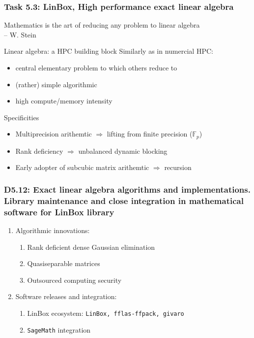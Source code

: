 \documentclass{beamer}
\begin{document}
\begin{frame}
  \frametitle{Task 5.3: LinBox, High performance exact linear algebra}
  \begin{displayquote}
    Mathematics is the art of reducing any problem to linear algebra\\
    \hfill{-- W. Stein}
      \end{displayquote}
  \begin{block} {Linear algebra: a HPC building block}
    Similarly as in numercial HPC:
    \begin{itemize}
    \item central elementary problem to which others reduce to
    \item (rather) simple algorithmic
    \item high compute/memory intensity
    \end{itemize}
  \end{block}
    \begin{block}{Specificities}
      \begin{itemize}
      \item Multiprecision arithemtic $\Rightarrow$ lifting from finite  precision ($\mathbb{F}_p$)
      \item Rank deficiency $\Rightarrow$ unbalanced dynamic blocking
      \item Early adopter of subcubic matrix arithemtic $\Rightarrow$ recursion
      \end{itemize}
    \end{block}
      
    \end{frame}
\begin{frame}
  \frametitle{D5.12: Exact linear algebra algorithms and implementations. Library maintenance and close integration in mathematical software for LinBox library}

  \begin{enumerate}
  \item Algorithmic innovations:
    \begin{enumerate}
    \item Rank deficient dense Gaussian elimination
    \item Quasiseparable matrices
    \item Outsourced computing security
    \end{enumerate}
  \item Software releases and integration:
    \begin{enumerate}
    \item LinBox ecosystem: \texttt{LinBox, fflas-ffpack, givaro}
    \item \texttt{SageMath} integration
    \end{enumerate}
  \end{enumerate}
\end{frame}
\end{document}
